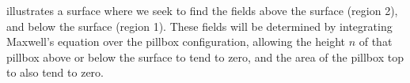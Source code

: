 %
%


 illustrates a surface where we seek to find the fields above the surface (region 2), and below the surface (region 1).
These fields will be determined by integrating Maxwell's equation over the pillbox configuration, allowing the height \( n \) of that pillbox above or below the surface to tend to zero,
and the area of the pillbox top to also tend to zero.
%
